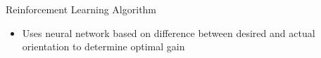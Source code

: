 \documentclass[final]{beamer}
\newlength{\onecolwid}
\begin{document}
\begin{frame}[t]
\begin{columns}[t]
\begin{column}{\onecolwid}
\begin{block}{Reinforcement Learning Algorithm}
\vskip -1cm
\begin{itemize}
    \item Uses neural network based on difference between desired and actual orientation to determine optimal gain
\end{itemize} 


\end{block}
\end{column}
\end{columns}
\end{frame}
\end{document}
